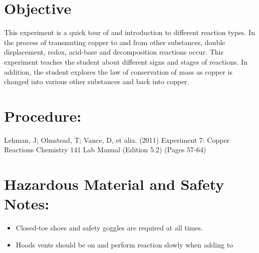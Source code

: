 \documentclass[11pt,letterpaper]{report}
\begin{document}
 



\section*{Objective} 
This experiment is a quick tour of and introduction to different reaction types. In the process of transmuting copper to and from other substances, double displacement, redox, acid-base and decomposition reactions occur. This experiment teaches the student about different signs and stages of reactions. In addition, the student explores the law of conservation of mass as copper is changed into various other substances and back into copper.

\section*{Procedure:}
Lehman, J; Olmstead, T; Vance, D, et alia. (2011)
Experiment 7: Copper Reactions
Chemistry 141 Lab Manual (Edition 5.2) (Pages 57-64)

\section*{Hazardous Material and Safety Notes:}
\begin{itemize}
\item Closed-toe shoes and safety goggles are required at all times. \\[-0.60cm]
\item Hoods vents should be on and perform reaction slowly when adding  to  \\[-0.60cm]
\end{itemize}
\end{document}
